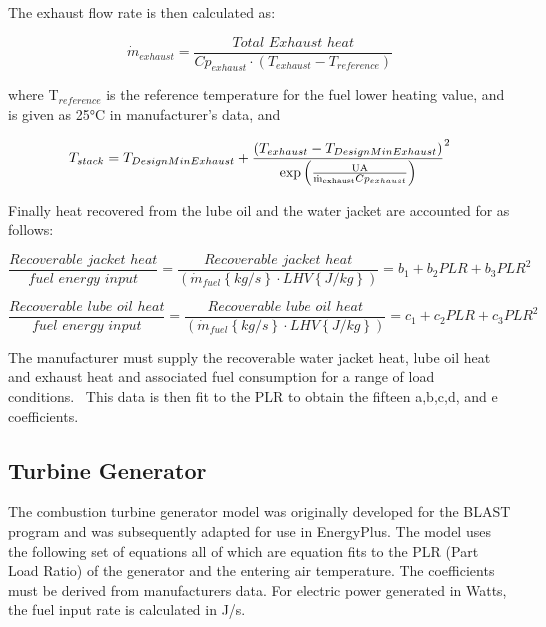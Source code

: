 The exhaust flow rate is then calculated as:

\begin{equation}
{\dot m_{exhaust}} = \frac{{Total\,\,Exhaust\,\,heat}}{{C{p_{exhaust}} \cdot \left( {{T_{exhaust}} - {T_{reference}}} \right)}}
\end{equation}

where T\(_{reference}\) is the reference temperature for the fuel lower heating value, and is given as 25°C in manufacturer's data, and

\begin{equation}
{T_{stack}} = {T_{DesignMinExhaust}} + {\frac{{\left( {{T_{exhaust}} - {T_{DesignMinExhaust}}} \right)}}{{{\rm{exp}}\left( {\frac{{{\rm{UA}}}}{{{{{\rm{\dot m}}}_{{\rm{exhaust}}}}C{p_{exhaust}}}}} \right)}}^2}
\end{equation}

Finally heat recovered from the lube oil and the water jacket are accounted for as follows:

\begin{equation}
\frac{{Recoverable\,\,jacket\,\,heat}}{{fuel\,\,energy\,\,input}} = \frac{{Recoverable\,\,jacket\,\,heat}}{{\left( {{{\dot m}_{fuel}}\left\{ {kg/s} \right\} \cdot LHV\left\{ {J/kg} \right\}} \right)}} = {b_1} + {b_2}PLR + {b_3}PL{R^2}
\end{equation}

\begin{equation}
\frac{{Recoverable\,\,lube\,\,oil\,\,heat}}{{fuel\,\,energy\,\,input}} = \frac{{Recoverable\,\,lube\,\,oil\,\,heat}}{{\left( {{{\dot m}_{fuel}}\left\{ {kg/s} \right\} \cdot LHV\left\{ {J/kg} \right\}} \right)}} = {c_1} + {c_2}PLR + {c_3}PL{R^2}
\end{equation}

The manufacturer must supply the recoverable water jacket heat, lube oil heat and exhaust heat and associated fuel consumption for a range of load conditions.~ This data is then fit to the PLR to obtain the fifteen a,b,c,d, and e coefficients.

\subsection{Turbine Generator}\label{turbine-generator}

The combustion turbine generator model was originally developed for the BLAST program and was subsequently adapted for use in EnergyPlus. The model uses the following set of equations all of which are equation fits to the PLR (Part Load Ratio) of the generator and the entering air temperature. The coefficients must be derived from manufacturers data. For electric power generated in Watts, the fuel input rate is calculated in J/s.

